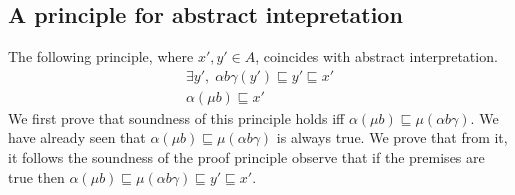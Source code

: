 \documentclass{llncs}
\begin{document}
%
%
%

\subsection{A principle for abstract intepretation}


The following principle, where $x',y' \in A$, coincides with abstract interpretation.
\begin{equation}%
 \begin{array}{c}
    \exists y', \;  \alpha b \gamma(y') \sqsubseteq y'\sqsubseteq x' \\
    \hline %
    \alpha(\mu b) \sqsubseteq x'
\end{array}
\end{equation}
%
We first prove that soundness of this principle holds iff $\alpha(\mu b ) \sqsubseteq \mu (\alpha b \gamma )$. We have already seen that $\alpha(\mu b ) \sqsubseteq \mu (\alpha b \gamma )$ is always true. We prove that from it, it follows the soundness of the proof principle observe that if the premises are true then $\alpha(\mu b ) \sqsubseteq \mu (\alpha b \gamma ) \sqsubseteq y' \sqsubseteq x'$.  
\end{document}
